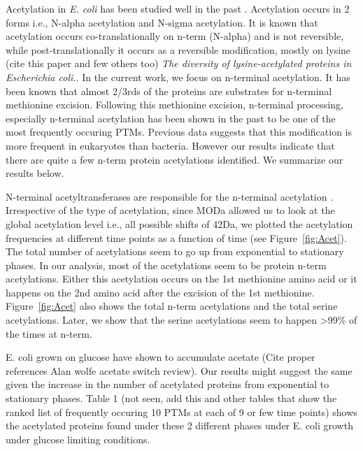 \documentclass[12pt]{article}
\begin{document}
Acetylation in \emph{E. coli} has been studied well in the past \cite{Charbautetal2002} \cite{Gordiyenkoetal2008}. Acetylation occurs in 2 forms i.e., N-{alpha} acetylation and N-{sigma} acetylation. It is known that acetylation occurs co-translationally on n-term (N-{alpha}) and is not reversible, while post-translationally it occurs as a reversible modification, mostly on lysine  (cite this paper and few others too) \emph{The diversity of lysine-acetylated proteins in Escherichia coli.}. In the current work, we focus on n-terminal acetylation. It has been known that almost 2/3rds of the proteins are substrates for n-terminal methionine excision. Following this methionine excision, n-terminal processing, especially n-terminal acetylation \cite{Driessenetal1985} has been shown in the past to be one of the most frequently occuring PTMs. Previous data suggests that this modification is more frequent in eukaryotes than bacteria. However our results indicate that there are quite a few n-term protein acetylations identified. We summarize our results below. 

N-terminal acetyltransferases are responsible for the n-terminal acetylation \cite{Starheimetal2012}.  Irrespective of the type of acetylation, since MODa allowed us to look at the global acetylation level i.e., all possible shifts of 42Da, we plotted the acetylation frequencies at different time points as a function of time (see Figure~\ref{fig:Acet}). The total number of acetylations seem to go up from exponential to stationary phases. In our analysis, most of the acetylations seem to be protein n-term acetylations. Either this acetylation occurs on the 1st methionine amino acid or it happens on the 2nd amino acid after the excision of the 1st methionine. Figure~\ref{fig:Acet} also shows the total n-term acetylations and the total serine acetylations. Later, we show that the serine acetylations seem to happen >99\% of the times at n-term.

E. coli grown on glucose have shown to accumulate acetate (Cite proper references Alan wolfe acetate switch review). Our results might suggest the same given the increase in the number of acetylated proteins from exponential to stationary phases. Table 1 (not seen, add this and other tables that show the ranked list of frequently occuring 10 PTMs at each of 9 or few time points) shows the acetylated proteins found under these 2 different phases under E. coli growth under glucose limiting conditions.

\end{document}
